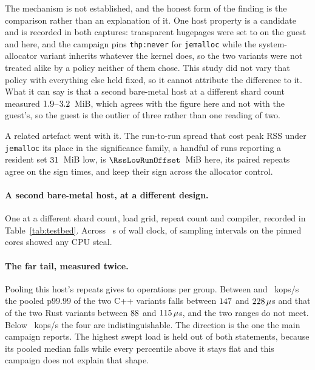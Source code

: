 \documentclass[english,oneside,a4paper,censored,csm,software-track-2020]{HYthesisML}
\begin{document}
The mechanism is not established, and the honest form of the finding is the comparison rather than
an explanation of it. One host property is a candidate and is recorded in both captures: transparent
hugepages were set to \GuestThp{} on the guest and \MainThp{} here, and the campaign pins
\texttt{thp:never} for \texttt{jemalloc} while the system-allocator variant inherits whatever the kernel
does, so the two variants were not treated alike by a policy neither of them chose. This study did not
vary that policy with everything else held fixed, so it cannot attribute the difference to it. What
it can say is that a second bare-metal host at a different shard count measured
$1.9$--$3.2$~MiB, which agrees with the figure here and not with the guest's,
so the guest is the outlier of three rather than one reading of two.

A related artefact went with it. The run-to-run spread that cost peak RSS under \texttt{jemalloc}
its place in the significance family, a handful of runs reporting a resident set
$31$~MiB low, is $\RssLowRunOffset$~MiB here, its paired repeats agree on the
sign \RssAgree{} times, and \CrossAllocConsistent{} keep their sign across the allocator control.

\paragraph{A second bare-metal host, at a different design.}
One \BmCpu{} at a different shard count, load grid, repeat count and compiler, recorded in
Table~\ref{tab:testbed}. Across \BmStealWindow{}~s of wall clock, \BmStealWithSteal{} of
\BmStealIntervals{} sampling intervals on the \BmStealCores{} pinned cores showed any CPU steal.

\paragraph{The far tail, measured twice.}
Pooling this host's repeats gives \BmPoolSamplesMin{} to \BmPoolSamplesMax{} operations per group.
Between \BmFarTailSepLoad{} and \BmFarTailSepHi{}~kops/s the pooled p99.99 of the two C++ variants
falls between $147$ and $228\,\mu$s and that of the two Rust variants
between $88$ and $115\,\mu$s, and the two ranges do not meet. Below
\BmFarTailSepLoad{}~kops/s the four are indistinguishable. The direction is the one the main
campaign reports. The highest swept load is held out of both statements, because its pooled
median falls while every percentile above it stays flat and this campaign does not explain that
shape.
\end{document}
